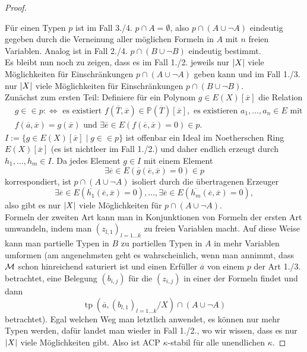 \begin{proof}
\begin{enumerate}
	\end{enumerate}
	Für einen Typen $p$ ist im Fall 3./4. $p\cap A=\emptyset$, also $p\cap(A\cup\neg A)$ eindeutig gegeben durch die Verneinung aller möglichen Formeln in $A$ mit $n$ freien Variablen. Analog ist in Fall 2./4. $p\cap(B\cup\neg B)$ eindeutig bestimmt.\\
	Es bleibt nun noch zu zeigen, dass es im Fall 1./2. jeweils nur ${\left| X \right|}$ viele Möglichkeiten für Einschränkungen $p\cap(A\cup\neg A)$ geben kann und im Fall 1./3. nur ${\left| X \right|}$ viele Möglichkeiten für Einschränkungen $p\cap(B\cup\neg B)$.\\
	Zunächst zum ersten Teil: Definiere für ein Polynom $g\in E(X)[\overline{x}]$ die Relation
	\begin{align*}&g\in\in p:\Leftrightarrow\text{ es existiert }f(\overline{T},\overline{x})\in\mathbb{P}(\overline{T})[\overline{x}],\text{ es existieren }a_1,\dots,a_n\in E\text{ mit }\\
	&f(\overline{a},\overline{x})=g(\overline{x})\text{ und }\exists\overline{e}\in E(f(\overline{e},\overline{x})=0)\in p.
	\end{align*}
	$I:=\{g\in E(X)[\overline{x}]\mid g\in\in p\}$ ist offenbar ein Ideal im Noetherschen Ring $E(X)[\overline{x}]$ (es ist nichtleer im Fall 1./2.) und daher endlich erzeugt durch $h_1,\dots,h_m\in I$. Da jedes Element $g\in I$ mit einem Element $$\exists\overline{e}\in E(\overline{g}(\overline{e},\overline{x})=0)\in p$$ korrespondiert, ist $p\cap(A\cup\neg A)$ isoliert durch die übertragenen Erzeuger $$\exists\overline{e}\in E(\overline{h_1}(\overline{e},\overline{x})=0),\dots,\exists\overline{e}\in E(\overline{h_m}(\overline{e},\overline{x})=0),$$ also gibt es nur ${\left| X \right|}$ viele Möglichkeiten für $p\cap(A\cup\neg A)$.\\
	Formeln der zweiten Art kann man in Konjunktionen von Formeln der ersten Art umwandeln, indem man $(z_{l,1})_{l=1\dots k}$ zu freien Variablen macht. Auf diese Weise kann man partielle Typen in $B$ zu partiellen Typen in $A$ in mehr Variablen umformen (am angenehmsten geht es wahrscheinlich, wenn man annimmt, dass $\mathcal{M}$ schon hinreichend saturiert ist und einen Erfüller $\overline{a}$ von einem $p$ der Art 1./3. betrachtet, eine Belegung $(b_{i,j})$ für die $(z_{i,j})$ in einer der Formeln findet und dann $$\operatorname{tp}(\overline{a},(b_{l,1})_{l=1\dots k}/X)\cap(A\cup\neg A)$$ betrachtet). Egal welchen Weg man letztlich anwendet, es können nur mehr Typen werden, dafür landet man wieder in Fall 1./2., wo wir wissen, dass es nur ${\left| X \right|}$ viele Möglichkeiten gibt. Also ist ACP $\kappa$-stabil für alle unendlichen $\kappa$.
\end{proof}